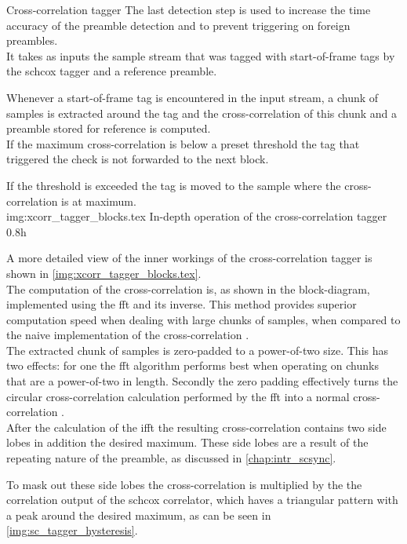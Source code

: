 \begin{subchapter}{Cross-correlation tagger}
  The last detection step is used to increase the time accuracy
  of the preamble detection and to prevent triggering on foreign
  preambles. \\

  It takes as inputs the sample stream that was tagged with
  start-of-frame tags by the \acrshort{schcox} tagger
  and a reference preamble.

  Whenever a start-of-frame tag is encountered in the input stream,
  a chunk of samples is extracted around the tag and the
  cross-correlation of this chunk and a preamble stored for reference
  is computed. \\

  If the maximum cross-correlation is below a preset threshold
  the tag that triggered the check is not forwarded to the
  next block.

  If the threshold is exceeded the tag is moved to the sample
  where the cross-correlation is at maximum. \\

               {img:xcorr_tagger_blocks.tex}
               {In-depth operation of the cross-correlation tagger}
               {0.8}{h}

  A more detailed view of the inner workings of the cross-correlation
  tagger is shown in \autoref{img:xcorr_tagger_blocks.tex}. \\

  The computation of the cross-correlation is, as shown in the
  block-diagram, implemented using the \acrlong{fft} and its inverse.
  This method provides superior computation speed when dealing
  with large chunks of samples, when compared to the naive implementation
  of the cross-correlation \cite{kammeyer2012}. \\

  The extracted chunk of samples is zero-padded to a power-of-two size.
  This has two effects: for one the \acrshort{fft} algorithm performs
  best when operating on chunks that are a power-of-two in length.
  Secondly the zero padding effectively turns the circular cross-correlation
  calculation performed by the \acrshort{fft} into a normal cross-correlation
  \cite{kammeyer2012}. \\

  After the calculation of the \acrshort{ifft} the resulting cross-correlation
  contains two side lobes in addition the desired maximum.
  These side lobes are a result of the repeating nature of the preamble, as
  discussed in \autoref{chap:intr_scsync}.

  To mask out these side lobes the cross-correlation is multiplied by
  the the correlation output of the \acrlong{schcox} correlator,
  which haves a triangular pattern with a peak around the desired
  maximum, as can be seen in \autoref{img:sc_tagger_hysteresis}.
\end{subchapter}
